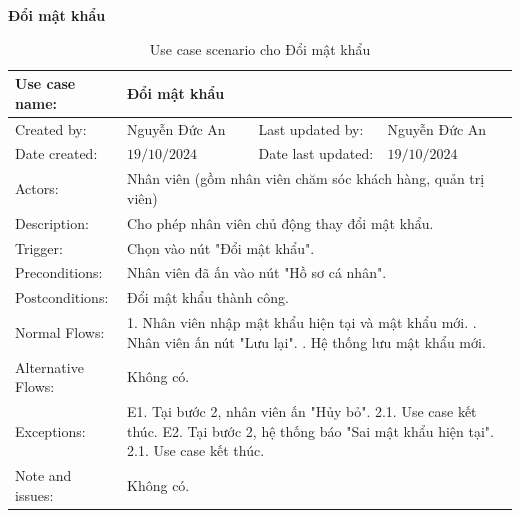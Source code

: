 \textbf{Đổi mật khẩu}
\begin{table}[H]
	\centering
	\begin{tabular}{|l|l|l|l|} 
		\hline Use case name: & \multicolumn{3}{|l|}{Đổi mật khẩu} \\ 
		\hline Created by: & Nguyễn Đức An & Last updated by: & Nguyễn Đức An \\ 
		\hline Date created: & $19 / 10 / 2024$ & Date last updated: & $19 / 10 / 2024$\\ 
		\hline Actors: & \multicolumn{3}{|l|}{ Nhân viên (gồm nhân viên chăm sóc khách hàng, quản trị viên) } \\ 
		\hline Description: & \multicolumn{3}{|p{12cm}|}{ Cho phép nhân viên chủ động thay đổi mật khẩu. } \\ 
		\hline Trigger: & \multicolumn{3}{|p{12cm}|}{ Chọn vào nút "Đổi mật khẩu". } \\ 
		\hline Preconditions: & \multicolumn{3}{|p{12cm}|}{ Nhân viên đã ấn vào nút "Hồ sơ cá nhân". } \\ 
		\hline Postconditions: & \multicolumn{3}{|p{12cm}|}{ Đổi mật khẩu thành công. } \\ 
		\hline Normal Flows: & \multicolumn{3}{|p{12cm}|}{ 
			1. Nhân viên nhập mật khẩu hiện tại và mật khẩu mới. \newline 
			2. Nhân viên ấn nút "Lưu lại". \newline 
			3. Hệ thống lưu mật khẩu mới. 
		} \\ 
		\hline Alternative Flows: & \multicolumn{3}{|p{12cm}|}{ Không có. } \\ 
		\hline Exceptions: & \multicolumn{3}{|p{12cm}|}{ 
			E1. Tại bước 2, nhân viên ấn "Hủy bỏ". \newline 
			\hspace{0.5cm}2.1. Use case kết thúc. \newline 
			E2. Tại bước 2, hệ thống báo "Sai mật khẩu hiện tại". \newline 
			\hspace{0.5cm}2.1. Use case kết thúc. 
		} \\ 
		\hline Note and issues: & \multicolumn{3}{|p{12cm}|}{ Không có. } \\ 
		\hline
	\end{tabular}
	\caption{Use case scenario cho Đổi mật khẩu}
\end{table}





